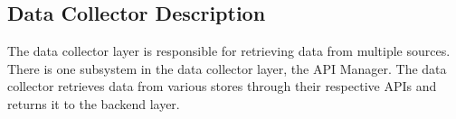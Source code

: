 \subsection{Data Collector Description}
The data collector layer is responsible for retrieving data from multiple sources. There is one subsystem in the data collector layer, the API Manager. The data collector retrieves data from various stores through their respective APIs and returns it to the backend layer.


